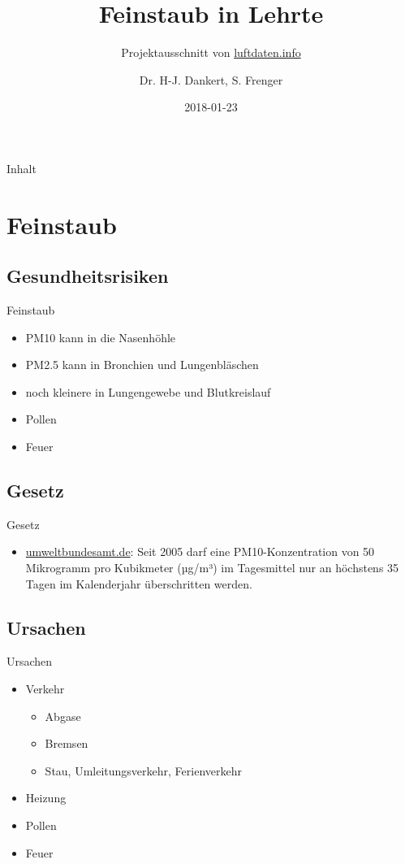 \documentclass[aspectratio=169]{beamer} %
\begin{document}
\title{Feinstaub in Lehrte}
\subtitle{Projektausschnitt von \href{http://www.luftdaten.info}{luftdaten.info}}
\author{Dr. H-J. Dankert, S. Frenger}
\date{2018-01-23} 

\frame{\titlepage} 

\begin{frame}{Inhalt}
  \begin{multicols}{2}
    \tableofcontents
  \end{multicols}
\end{frame}

\section{Feinstaub}

\subsection{Gesundheitsrisiken}
\begin{frame}{Feinstaub}
  \begin{itemize}
  \item PM10 kann in die Nasenhöhle
  \item PM2.5 kann in Bronchien und Lungenbläschen 
  \item noch kleinere in Lungengewebe und Blutkreislauf
  \item Pollen
  \item Feuer
  \end{itemize}
\end{frame}

\subsection{Gesetz}
\begin{frame}{Gesetz}
  \begin{itemize}
  \item \href{https://www.umweltbundesamt.de/daten/luft/feinstaub-belastung}{umweltbundesamt.de}:
    Seit 2005 darf eine PM10-Konzentration von 50 Mikrogramm pro Kubikmeter (µg/m³) im Tagesmittel nur an höchstens 35 Tagen im Kalenderjahr überschritten werden.
  \end{itemize}
\end{frame}


\subsection{Ursachen}
\begin{frame}{Ursachen}
  \begin{itemize}
  \item Verkehr
    \begin{itemize}
    \item Abgase
    \item Bremsen
    \item Stau, Umleitungsverkehr, Ferienverkehr
    \end{itemize}
  \item Heizung
  \item Pollen
  \item Feuer
  \end{itemize}
\end{frame}
\end{document}
